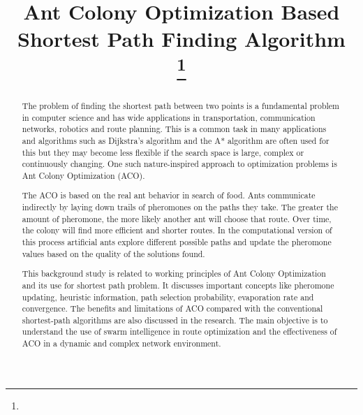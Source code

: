 \documentclass[conference]{IEEEtran}
\begin{document}
\title{Ant Colony Optimization Based Shortest Path Finding Algorithm\\
{\footnotesize \textsuperscript{}}
\thanks{}
}

\author{
\and

}


\maketitle

\begin{abstract}
The problem of finding the shortest path between two points is a fundamental problem in computer science and has wide applications in transportation, communication networks, robotics and route planning. This is a common task in many applications and algorithms such as Dijkstra’s algorithm and the A* algorithm are often used for this but they may become less flexible if the search space is large, complex or continuously changing. One such nature-inspired approach to optimization problems is Ant Colony Optimization (ACO).

The ACO is based on the real ant behavior in search of food. Ants communicate indirectly by laying down trails of pheromones on the paths they take. The greater the amount of pheromone, the more likely another ant will choose that route. Over time, the colony will find more efficient and shorter routes. In the computational version of this process artificial ants explore different possible paths and update the pheromone values based on the quality of the solutions found.

This background study is related to working principles of Ant Colony Optimization and its use for shortest path problem. It discusses important concepts like pheromone updating, heuristic information, path selection probability, evaporation rate and convergence. The benefits and limitations of ACO compared with the conventional shortest-path algorithms are also discussed in the research. The main objective is to understand the use of swarm intelligence in route optimization and the effectiveness of ACO in a dynamic and complex network environment.


\end{abstract}
\end{document}
